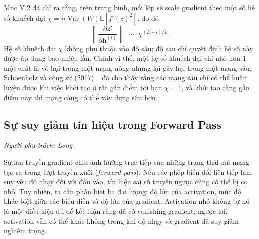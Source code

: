 \documentclass[12pt]{article}
\begin{document}
Mục V.2 đã chỉ ra rằng, trên trung bình, mỗi lớp sẽ scale gradient theo một số hệ số khuếch đại $\chi = n \operatorname{Var}(W) \mathbb{E}[f'(z)^2]$, do đó
\[
\left\| \frac{\partial \mathcal{L}}{\partial \mathbf{h}^{(l)}} \right\| \;\sim\; \chi^{(L-l)/2}.
\]
Hệ số khuếch đại $\chi$ không phụ thuộc vào độ sâu; độ sâu chỉ quyết định hệ số này được áp dụng bao nhiêu lần. Chính vì thế, một hệ số khuếch đại chỉ nhỏ hơn 1 một chút là vô hại trong một mạng nông nhưng lại gây hại trong một mạng sâu. Schoenholz và cộng sự (2017) ~\cite{long-schoenholz2017} đã cho thấy rằng các mạng sâu chỉ có thể huấn luyện được khi việc khởi tạo ở rất gần điểm tới hạn $\chi = 1$, và khởi tạo càng gần điểm này thì mạng càng có thể xây dựng sâu hơn.

\subsection{Sự suy giảm tín hiệu trong Forward Pass}
\label{sec:long-forward}
\textit{Người phụ trách: Long}

Sự lan truyền gradient chịu ảnh hưởng trực tiếp của những trạng thái mà mạng tạo ra trong lượt truyền xuôi (\textit{forward pass}). Nếu các phép biến đổi liên tiếp làm suy yếu độ nhạy đối với đầu vào, tín hiệu sai số truyền ngược cũng có thể bị co nhỏ. Tuy nhiên, ta cần phân biệt ba đại lượng: độ lớn của activation, mức độ khác biệt giữa các biểu diễn và độ lớn của gradient. Activation nhỏ không tự nó là một điều kiện đủ để kết luận rằng đã có vanishing gradient; ngược lại, activation vẫn có thể khác không trong khi độ nhạy và gradient đã suy giảm nghiêm trọng.
\end{document}
